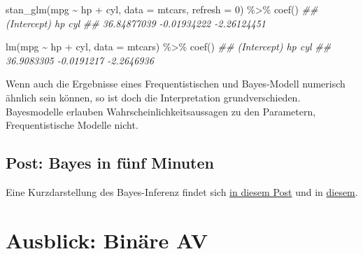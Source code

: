 \documentclass[
  a4paper,
  DIV=11]{scrreprt}
\newenvironment{Shaded}{\begin{snugshade}}{\end{snugshade}}
\newcommand{\AttributeTok}[1]{\textcolor[rgb]{0.40,0.45,0.13}{#1}}
\newcommand{\DecValTok}[1]{\textcolor[rgb]{0.68,0.00,0.00}{#1}}
\newcommand{\DocumentationTok}[1]{\textcolor[rgb]{0.37,0.37,0.37}{\textit{#1}}}
\newcommand{\FunctionTok}[1]{\textcolor[rgb]{0.28,0.35,0.67}{#1}}
\newcommand{\NormalTok}[1]{\textcolor[rgb]{0.00,0.23,0.31}{#1}}
\newcommand{\SpecialCharTok}[1]{\textcolor[rgb]{0.37,0.37,0.37}{#1}}
\theoremstyle{definition}
\theoremstyle{remark}
\begin{document}
\begin{Shaded}
\begin{Highlighting}[]
\FunctionTok{stan\_glm}\NormalTok{(mpg }\SpecialCharTok{\textasciitilde{}}\NormalTok{ hp }\SpecialCharTok{+}\NormalTok{ cyl, }\AttributeTok{data =}\NormalTok{ mtcars, }\AttributeTok{refresh =} \DecValTok{0}\NormalTok{) }\SpecialCharTok{\%\textgreater{}\%} \FunctionTok{coef}\NormalTok{()}
\DocumentationTok{\#\# (Intercept)          hp         cyl }
\DocumentationTok{\#\# 36.84877039 {-}0.01934222 {-}2.26124451}

\FunctionTok{lm}\NormalTok{(mpg }\SpecialCharTok{\textasciitilde{}}\NormalTok{ hp }\SpecialCharTok{+}\NormalTok{ cyl, }\AttributeTok{data =}\NormalTok{ mtcars) }\SpecialCharTok{\%\textgreater{}\%} \FunctionTok{coef}\NormalTok{()}
\DocumentationTok{\#\# (Intercept)          hp         cyl }
\DocumentationTok{\#\#  36.9083305  {-}0.0191217  {-}2.2646936}
\end{Highlighting}
\end{Shaded}

\begin{tcolorbox}[enhanced jigsaw, leftrule=.75mm, left=2mm, bottomrule=.15mm, opacityback=0, coltitle=black, colbacktitle=quarto-callout-important-color!10!white, opacitybacktitle=0.6, rightrule=.15mm, toptitle=1mm, colback=white, colframe=quarto-callout-important-color-frame, arc=.35mm, toprule=.15mm, breakable, titlerule=0mm, bottomtitle=1mm, title=\textcolor{quarto-callout-important-color}{\faExclamation}\hspace{0.5em}{Wichtig}]
Wenn auch die Ergebnisse eines Frequentistischen und Bayes-Modell
numerisch ähnlich sein können, so ist doch die Interpretation
grundverschieden. Bayesmodelle erlauben Wahrscheinlichkeitsaussagen zu
den Parametern, Frequentistische Modelle nicht.
\end{tcolorbox}

\hypertarget{post-bayes-in-fuxfcnf-minuten}{%
\subsection{Post: Bayes in fünf
Minuten}\label{post-bayes-in-fuxfcnf-minuten}}

Eine Kurzdarstellung des Bayes-Inferenz findet sich
\href{https://data-se.netlify.app/2022/01/27/bayes-in-f\%C3\%BCnf-minuten/}{in
diesem Post} und in
\href{https://data-se.netlify.app/2022/01/28/bayes-in-f\%C3\%BCnf-minuten-f\%C3\%BCr-fortgeschrittene/}{diesem}.

\hypertarget{ausblick-binuxe4re-av}{%
\section{Ausblick: Binäre AV}\label{ausblick-binuxe4re-av}}
\end{document}
